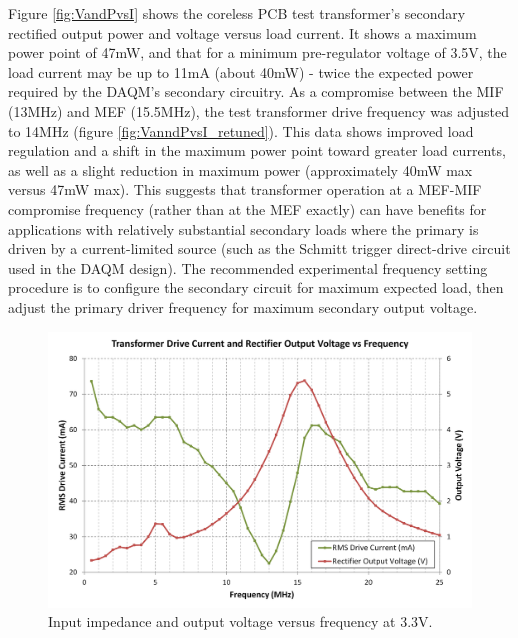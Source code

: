 \documentclass[conference]{IEEEtran}
\begin{document}
	Figure \ref{fig:VandPvsI} shows the coreless PCB test transformer's secondary rectified output power and voltage versus load current.  It shows a maximum power point of 47mW, and that for a minimum pre-regulator voltage of 3.5V, the load current may be up to 11mA (about 40mW) - twice the expected power required by the DAQM's secondary circuitry.  
	As a compromise between the MIF (13MHz) and MEF (15.5MHz), the test transformer drive frequency was adjusted to 14MHz (figure \ref{fig:VanndPvsI_retuned}).  This data shows improved load regulation and a shift in the maximum power point toward greater load currents, as well as a slight reduction in maximum power (approximately 40mW max versus 47mW max).  This suggests that transformer operation at a MEF-MIF compromise frequency (rather than at the MEF exactly) can have benefits for applications with relatively substantial secondary loads where the primary is driven by a current-limited source (such as the Schmitt trigger direct-drive circuit used in the DAQM design).  The recommended experimental frequency setting procedure is to configure the secondary circuit for maximum expected load, then adjust the primary driver frequency for maximum secondary output voltage.

	\begin{figure}[t]
		\centering
		\includegraphics[width=1\columnwidth]{./img/ZandVoutVsF_3V3}
		\caption{Input impedance and output voltage versus frequency at 3.3V.}
		\label{fig:ZandVvsF}
	\end{figure}
	
\end{document}
